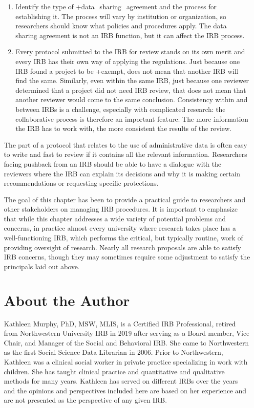 \documentclass[
]{book}
\begin{document}
\begin{enumerate}
\item
  Identify the type of +data\_sharing\_agreement\textbar{} and the process for establishing it. The process will vary by institution or organization, so researchers should know what policies and procedures apply. The data sharing agreement is not an IRB function, but it can affect the IRB process.
\item
  Every protocol submitted to the IRB for review stands on its own merit and every IRB has their own way of applying the regulations. Just because one IRB found a project to be +exempt\textbar, does not mean that another IRB will find the same. Similarly, even within the same IRB, just because one reviewer determined that a project did not need IRB review, that does not mean that another reviewer would come to the same conclusion. Consistency within and between IRBs is a challenge, especially with complicated research: the collaborative process is therefore an important feature. The more information the IRB has to work with, the more consistent the results of the review.
\end{enumerate}

The part of a protocol that relates to the use of administrative data is often easy to write and fast to review if it contains all the relevant information. Researchers facing pushback from an IRB should be able to have a dialogue with the reviewers where the IRB can explain its decisions and why it is making certain recommendations or requesting specific protections.

The goal of this chapter has been to provide a practical guide to researchers and other stakeholders on managing IRB procedures. It is important to emphasize that while this chapter addresses a wide variety of potential problems and concerns, in practice almost every university where research takes place has a well-functioning IRB, which performs the critical, but typically routine, work of providing oversight of research. Nearly all research proposals are able to satisfy IRB concerns, though they may sometimes require some adjustment to satisfy the principals laid out above.

\hypertarget{about-the-author-1}{%
\section*{About the Author}\label{about-the-author-1}}

Kathleen Murphy, PhD, MSW, MLIS, is a Certified IRB Professional, retired from Northwestern University IRB in 2019 after serving as a Board member, Vice Chair, and Manager of the Social and Behavioral IRB. She came to Northwestern as the first Social Science Data Librarian in 2006. Prior to Northwestern, Kathleen was a clinical social worker in private practice specializing in work with children. She has taught clinical practice and quantitative and qualitative methods for many years. Kathleen has served on different IRBs over the years and the opinions and perspectives included here are based on her experience and are not presented as the perspective of any given IRB.
\end{document}
